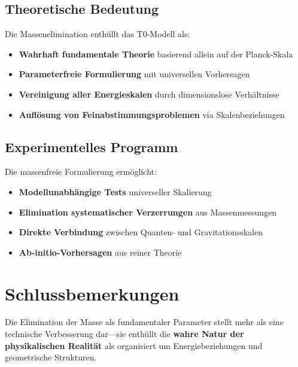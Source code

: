 	\subsection{Theoretische Bedeutung}
	\label{subsec:theoretical_significance}
	
	Die Massenelimination enthüllt das T0-Modell als:
	
	\begin{tcolorbox}[colback=green!5!white,colframe=green!75!black,title=T0-Modell: Wahre Natur]
		\begin{itemize}
			\item \textbf{Wahrhaft fundamentale Theorie} basierend allein auf der Planck-Skala
			\item \textbf{Parameterfreie Formulierung} mit universellen Vorhersagen
			\item \textbf{Vereinigung aller Energieskalen} durch dimensionslose Verhältnisse
			\item \textbf{Auflösung von Feinabstimmungsproblemen} via Skalenbeziehungen
		\end{itemize}
	\end{tcolorbox}
	
	\subsection{Experimentelles Programm}
	\label{subsec:experimental_program}
	
	Die massenfreie Formulierung ermöglicht:
	
	\begin{itemize}
		\item \textbf{Modellunabhängige Tests} universeller Skalierung
		\item \textbf{Elimination systematischer Verzerrungen} aus Massenmessungen
		\item \textbf{Direkte Verbindung} zwischen Quanten- und Gravitationsskalen
		\item \textbf{Ab-initio-Vorhersagen} aus reiner Theorie
	\end{itemize}
	
	\section{Schlussbemerkungen}
	\label{sec:final_remarks}
	
	Die Elimination der Masse als fundamentaler Parameter stellt mehr als eine technische Verbesserung dar—sie enthüllt die \textbf{wahre Natur der physikalischen Realität} als organisiert um Energiebeziehungen und geometrische Strukturen. 
	
